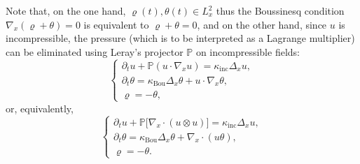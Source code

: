 \documentclass[AHL,Unicode,longabstracts,published]{cedram}
\newcommand{\Inc}{\mathrm{inc}}
\newcommand{\Bou}{\mathrm{Bou}}
\newcommand{\bbP}{\mathbb{P}}
\begin{document}
Note that, on the one hand, $\varrho(t), \theta(t) \in L^2_x$ thus the Boussinesq condition $\nabla_x (\varrho + \theta) = 0$ is equivalent to $\varrho + \theta = 0$, and on the other hand, since $u$ is incompressible, the pressure (which is to be interpreted as a Lagrange multiplier) can be eliminated using Leray's projector $\bbP$ on incompressible fields:
\begin{equation}\label{eq:NSF_1}
\begin{cases}
\partial_t u + \bbP \left(u \cdot \nabla_x u \right) = \kappa_\Inc \Delta_x u,\\
\partial_t \theta = \kappa_\Bou \Delta_x \theta + u \cdot \nabla_x \theta, \\
\varrho =- \theta,
\end{cases}
\end{equation}
or, equivalently,
\begin{equation}\label{eq:NSF_2}
\begin{cases}
\partial_t u + \bbP \big[\nabla_x \cdot (u \otimes u) \big] = \kappa_\Inc \Delta_x u,\\
\partial_t \theta = \kappa_\Bou \Delta_x \theta + \nabla_x \cdot (u \theta), \\
\varrho = -\theta.
\end{cases}
\end{equation}
\end{document}
